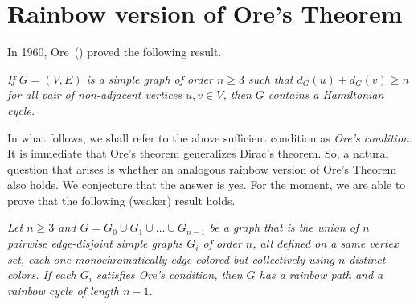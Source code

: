 
\chapter{Rainbow version of Ore's Theorem}
\label{chap:ore}

In 1960, Ore~(\cite{Ore_1960}) proved the following result.

\bigskip

  \textsl{If $G = (V, E)$ is a simple graph of order  $n\geq 3$  such that 
  $d_G(u) + d_G(v) \geq n$ for all pair of non-adjacent vertices $u, v \in V$,
  then $G$ contains a Hamiltonian cycle.}

\bigskip
  
In what follows, we shall refer to the above sufficient condition as \emph{Ore's condition}. 
It is immediate that Ore's theorem generalizes Dirac's theorem. So, a natural question that arises
is whether an analogous  rainbow version of Ore's Theorem also holds. We conjecture that
the answer is yes. For the moment, we are able to prove that the following (weaker) result holds.

\bigskip

\textsl{Let $n\geq 3$ and $G = G_0 \cup G_1 \cup \ldots \cup G_{n-1}$ be a
graph that is the union of $n$ pairwise edge-disjoint simple graphs
$G_i$ of order $n$, all defined on a same vertex set, each one
monochromatically edge colored but collectively using $n$ distinct
colors. If each $G_i$ satisfies Ore's condition, then $G$ has a
rainbow path and a rainbow cycle of length $n-1$.}

\medskip

